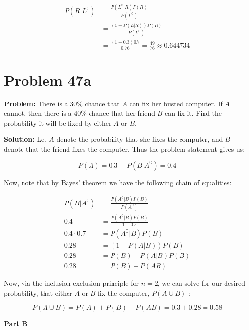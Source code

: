 \documentclass{article}
\begin{document}
\begin{align*}
    P(R| L^\complement)&=\frac{P(L^\complement| R)P(R)}{P(L^\complement)}\tag{Bayes' theorem}\\
    &=\frac{(1-P(L| R))P(R)}{P(L^\complement)}\tag{complement of conditional}\\
    &=\frac{(1-0.3)0.7}{0.76}=\frac{49}{76}\approx0.644734
\end{align*}

\section*{Problem 47a}
\noindent\textbf{Problem:} There is a 30\% chance that $A$ can fix her busted computer. If $A$ cannot, then there is a 40\% chance that her friend $B$ can fix it. Find the probability it will be fixed by either $A$ or $B$.
\bigskip

\noindent\textbf{Solution:} Let $A$ denote the probability that she fixes the computer, and $B$ denote that the friend fixes the computer. Thus the problem statement gives us:

\begin{equation*}
    P(A)=0.3\,\,\,\,\,\,\,\,P(B| A^\complement)=0.4
\end{equation*}
\pagebreak

Now, note that by Bayes' theorem we have the following chain of equalities:

\begin{align*}
    P(B|A^\complement)&=\frac{P(A^\complement| B)P(B)}{P(A^\complement)}\tag{Bayes' theorem}\\
    0.4&=\frac{P(A^\complement| B)P(B)}{1-0.3}\\
    0.4\cdot0.7&=P(A^\complement| B)P(B)\\
    0.28&=(1-P(A| B))P(B)\tag{complement of conditional}\\
    0.28&=P(B)-P(A| B)P(B)\\
    0.28&=P(B)-P(AB)\tag{def. of conditional probability}
\end{align*}

Now, via the inclusion-exclusion principle for $n=2$, we can solve for our desired probability, that either $A$ or $B$ fix the computer, $P(A\cup B)$ :

\begin{equation*}
    P(A\cup B)=P(A)+P(B)-P(AB)=0.3+0.28=0.58
\end{equation*}
\bigskip

\begin{center}
    \Large\textbf{Part B}
\end{center}
\end{document}
